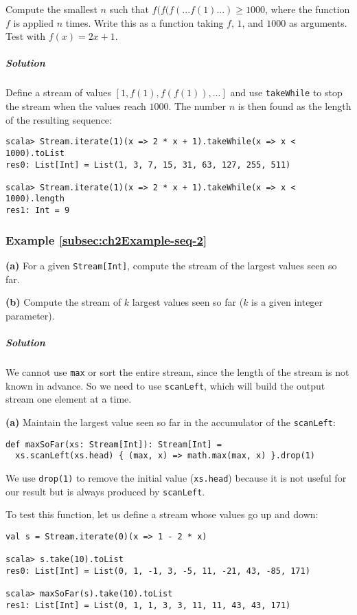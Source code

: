 Compute the smallest $n$ such that $f(f(f(...f(1)...)\geq1000$,
where the function $f$ is applied $n$ times. Write this as a function
taking $f$, $1$, and $1000$ as arguments. Test with $f(x)=2x+1$.

\subparagraph{Solution}

Define a stream of values $\left[1,f(1),f(f(1)),...\right]$ and use
\lstinline!takeWhile! to stop the stream when the values reach $1000$.
The number $n$ is then found as the length of the resulting sequence:
\begin{lstlisting}
scala> Stream.iterate(1)(x => 2 * x + 1).takeWhile(x => x < 1000).toList
res0: List[Int] = List(1, 3, 7, 15, 31, 63, 127, 255, 511)

scala> Stream.iterate(1)(x => 2 * x + 1).takeWhile(x => x < 1000).length
res1: Int = 9
\end{lstlisting}


\subsubsection{Example \label{subsec:ch2Example-seq-2}\ref{subsec:ch2Example-seq-2}}

\textbf{(a)} For a given \lstinline!Stream[Int]!, compute the stream
of the largest values seen so far.

\textbf{(b)} Compute the stream of $k$ largest values seen so far
($k$ is a given integer parameter).

\subparagraph{Solution}

We cannot use \lstinline!max! or sort the entire stream, since the
length of the stream is not known in advance. So we need to use \lstinline!scanLeft!,
which will build the output stream one element at a time.

\textbf{(a)} Maintain the largest value seen so far in the accumulator
of the \lstinline!scanLeft!:
\begin{lstlisting}
def maxSoFar(xs: Stream[Int]): Stream[Int] =
  xs.scanLeft(xs.head) { (max, x) => math.max(max, x) }.drop(1)
\end{lstlisting}
We use \lstinline!drop(1)! to remove the initial value (\lstinline!xs.head!)
because it is not useful for our result but is always produced by
\lstinline!scanLeft!.

To test this function, let us define a stream whose values go up and
down:
\begin{lstlisting}
val s = Stream.iterate(0)(x => 1 - 2 * x)

scala> s.take(10).toList
res0: List[Int] = List(0, 1, -1, 3, -5, 11, -21, 43, -85, 171)

scala> maxSoFar(s).take(10).toList
res1: List[Int] = List(0, 1, 1, 3, 3, 11, 11, 43, 43, 171)
\end{lstlisting}

